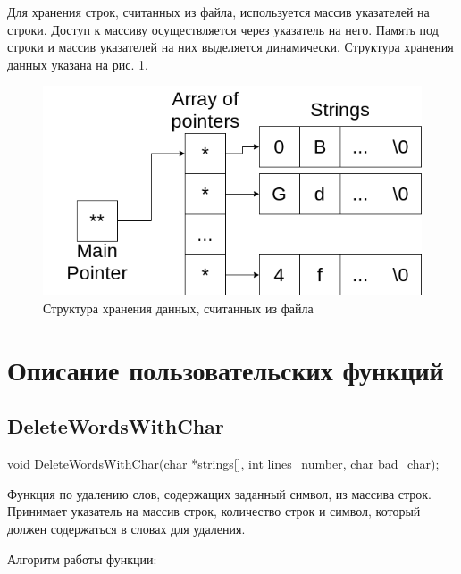 \documentclass[12pt,a4paper]{article}  %
\begin{document}
	Для хранения строк, считанных из файла, используется массив указателей на строки. Доступ к массиву осуществляется через указатель на него. Память под строки и массив указателей на них выделяется динамически. Структура хранения данных указана на рис. \ref{data_schema}.
	\begin{figure}[hpt!]
		\centering
	 	\includegraphics[width=0.6\linewidth]{photo/data_schema}
	 	\caption{Структура хранения данных, считанных из файла}
	 	\label{data_schema}
	\end{figure}
	
	\section*{Описание пользовательских функций}
	
	\subsection*{DeleteWordsWithChar}
	void DeleteWordsWithChar(char *strings[], int lines\_number, char bad\_char);
	
	Функция по удалению слов, содержащих заданный символ, из массива строк. Принимает указатель на массив строк, количество строк и символ, который должен содержаться в словах для удаления.
	
	
	Алгоритм работы функции:
	
\end{document}
